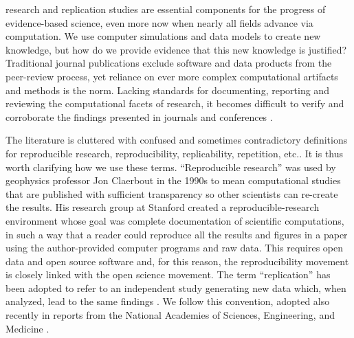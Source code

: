 \documentclass[10pt,journal,compsoc]{IEEEtran}
\begin{document}
 research and replication studies are essential components for the progress of evidence-based science, even more now when nearly all fields advance via computation.
We use computer simulations and data models to create new knowledge,
but how do we provide evidence that this new knowledge is justified? 
Traditional journal publications exclude software and data products from the peer-review process, yet reliance on ever more complex computational artifacts and methods is the norm.
Lacking standards for documenting, reporting and reviewing the computational facets of research, it becomes difficult to verify and corroborate the findings presented in journals and conferences \cite{donoho_et_al_2009}.

The literature is cluttered with confused and sometimes contradictory definitions for reproducible research, reproducibility, replicability, repetition, etc.\cite{barba_2018}.
It is thus worth clarifying how we use these terms.
``Reproducible research'' was used by geophysics professor Jon Claerbout in the 1990s to mean computational studies that are published with sufficient transparency so other scientists can re-create the results. His research group at Stanford created a reproducible-research environment\cite{schwab_et_al_2000} whose goal was complete documentation of scientific computations, in such a way that a reader could reproduce all the results and figures in a paper using the author-provided computer programs and raw data.
This requires open data and open source software and, for this reason, the reproducibility movement is closely linked with the open science movement.
The term ``replication'' has been adopted to refer to an independent study generating new data which, when analyzed, lead to the same findings \cite{peng_2011}.
We follow this convention, adopted also recently in reports from the National Academies of Sciences, Engineering, and Medicine \cite{nasa_oss_2018,nasem_2019}.
\end{document}
